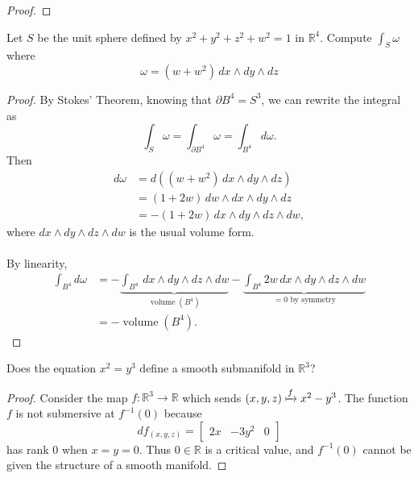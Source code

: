 \documentclass{article}
\newenvironment{problem}[2][Problem]{\begin{trivlist}
\item[\hskip \labelsep {\bfseries #1}\hskip \labelsep {\bfseries #2.}]}{\end{trivlist}}
\begin{document}
\begin{proof}
  
\end{proof}

\pagebreak

\begin{problem}{6}
  Let $S$ be the unit sphere defined by $x^2 + y^2 + z^2 + w^2 = 1$ in
  $\mathbb{R}^4$. Compute $\int_S\omega$ where \[
    \omega = (w + w^2)\, dx \wedge dy \wedge dz
  \]
\end{problem}

\begin{proof}
  By Stokes' Theorem, knowing that $\partial B^4 = S^3$, we can rewrite the
  integral as \[
    \int_S\omega = \int_{\partial B^4}\omega = \int_{B^4} d\omega.
  \]
  Then \begin{align*}
    d\omega
    &= d((w + w^2)\, dx \wedge dy \wedge dz) \\
    &= (1 + 2w)\,dw \wedge dx \wedge dy \wedge dz \\
    &= -(1 + 2w)\, dx \wedge dy \wedge dz \wedge dw,
  \end{align*} where $dx \wedge dy \wedge dz \wedge dw$ is the usual volume
  form.
  \\~\\
  By linearity, \begin{align*}
    \int_{B^4} d\omega
    &= -\underbrace{\int_{B^4}\, dx \wedge dy \wedge dz \wedge dw}_{\operatorname{volume}(B^4)} -
      \underbrace{\int_{B^4}2w\, dx \wedge dy \wedge dz \wedge dw}_{=0 \text{ by symmetry}} \\
    &= -\operatorname{volume}(B^4).
  \end{align*}
\end{proof}

\pagebreak

\begin{problem}{7}
  Does the equation $x^2 = y^3$ define a smooth submanifold in $\mathbb{R}^3$?
\end{problem}

\begin{proof}
  Consider the map $f\colon \mathbb R^3 \rightarrow \mathbb R$ which sends
  $(x,y,z) \xmapsto f x^2  - y^3$. The function $f$ is not submersive at $f^{-1}(0)$ because
  \[
    df_{(x,y,z)} =
    \begin{bmatrix}
      2x & -3y^2 & 0
    \end{bmatrix}
  \] has rank $0$ when $x=y=0$. Thus $0 \in \mathbb R$ is a critical value, and
  $f^{-1}(0)$ cannot be given the structure of a smooth manifold.
\end{proof}
\end{document}
